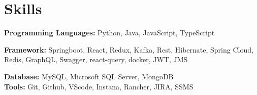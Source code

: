 \documentclass[letterpaper,11pt]{article}
\makeatletter
\newcommand{\resumeItem}[1]{
  \item\small{
    {#1 \vspace{-2pt}}
  }
}
\newcommand{\resumeSubheading}[4]{
  \vspace{-2pt}\item
    \begin{tabular*}{0.97\textwidth}[t]{l@{\extracolsep{\fill}}r}
      \textbf{#1} & #2 \\
      \textit{\small#3} & \textit{\small #4} \\
    \end{tabular*}\vspace{-7pt}
}
\newcommand{\resumeSubHeadingListStart}{\begin{itemize}[leftmargin=0.15in, label={}]}
\newcommand{\resumeSubHeadingListEnd}{\end{itemize}}
\newcommand{\resumeItemListStart}{\begin{itemize}}
\newcommand{\resumeItemListEnd}{\end{itemize}\vspace{-5pt}}
\makeatother
\begin{document}
    



\section{Skills}
  \vspace{1pt}
  \resumeSubHeadingListStart
    \small{\item{
        \textbf{Programming Languages:}{ Python, Java, JavaScript, TypeScript} \\ \vspace{3pt}
        
       \textbf{Framework:}{ Springboot, React, Redux, Kafka, Rest, Hibernate, Spring Cloud, Redis, GraphQL, Swagger, react-query, docker, JWT, JMS} \\ \vspace{3pt}
        
        \textbf{Database:}{ MySQL, Microsoft SQL Server, MongoDB}
        \\ \vspace{3pt}
        \textbf{Tools:}{ Git, Github, VScode, Instana, Rancher, JIRA, SSMS}
        \\ \vspace{3pt}
        
    }}
  \resumeSubHeadingListEnd
\end{document}
